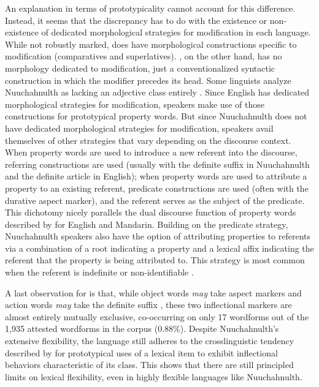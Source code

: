 An explanation in terms of prototypicality cannot account for this difference. Instead, it seems that the discrepancy has to do with the existence or non-existence of dedicated morphological strategies for modification in each language. While not robustly marked,  does have morphological constructions specific to modification (comparatives and superlatives). , on the other hand, has no morphology dedicated to modification, just a conventionalized syntactic construction in which the modifier precedes its head. Some linguists analyze Nuuchahnulth as lacking an adjective class entirely \parencite{Nakayama2001}. Since English has dedicated morphological strategies for modification, speakers make use of those constructions for prototypical property words. But since Nuuchahnulth does not have dedicated morphological strategies for modification, speakers avail themselves of other strategies that vary depending on the discourse context. When property words are used to introduce a new referent into the discourse, referring constructions are used (usually with the definite suffix  in Nuuchahnulth and the definite article in English); when property words are used to attribute a property to an existing referent, predicate constructions are used (often with the durative aspect marker), and the referent serves as the subject of the predicate. This dichotomy nicely parallels the dual discourse function of property words described by \textcite{Thompson1989} for English and Mandarin. Building on the predicate strategy, Nuuchahnulth speakers also have the option of attributing properties to referents via a combination of a root indicating a property and a lexical affix indicating the referent that the property is being attributed to. This strategy is most common when the referent is indefinite or non-identifiable \parencite[144]{Nakayama2001}.

A last observation for  is that, while object words \emph{may} take aspect markers and action words \emph{may} take the definite suffix , these two inflectional markers are almost entirely mutually exclusive, co-occurring on only 17 wordforms out of the 1,935 attested wordforms in the corpus (0.88\%). Despite Nuuchahnulth's extensive flexibility, the language still adheres to the crosslinguistic tendency described by \textcite{HopperThompson1984} for prototypical uses of a lexical item to exhibit inflectional behaviors characteristic of its class. This shows that there are still principled limits on lexical flexibility, even in highly flexible languages like Nuuchahnulth.

